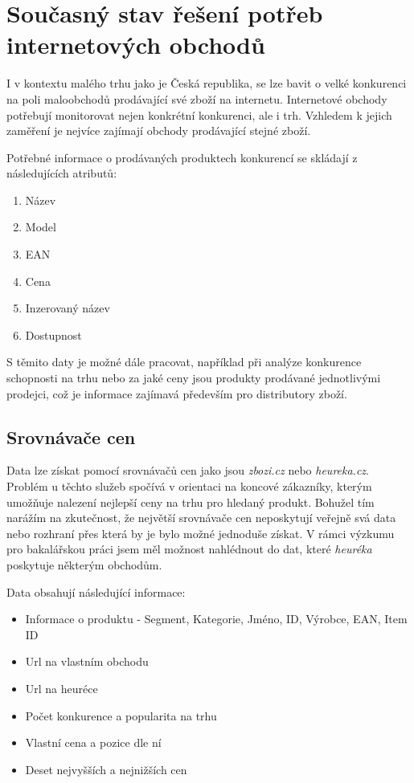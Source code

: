\documentclass[thesis=B,czech]{FITthesis}[2012/06/26]
\begin{document}
\newpage

\section{Současný stav řešení potřeb internetových obchodů}
I v kontextu malého trhu jako je Česká republika, se lze bavit o velké konkurenci na poli 
maloobchodů prodávající své zboží na internetu.
Internetové obchody potřebují monitorovat nejen konkrétní konkurenci, ale i trh. Vzhledem k jejich zaměření je nejvíce zajímají 
obchody prodávající stejné zboží. 
\par
Potřebné informace o prodávaných produktech konkurencí se skládají z následujících atributů:

\begin{enumerate}
\item Název
\item Model
\item EAN
\item Cena
\item Inzerovaný název
\item Dostupnost
\end{enumerate}

S těmito daty je možné dále pracovat, například při analýze konkurence schopnosti na trhu nebo za jaké ceny jsou produkty prodávané
jednotlivými prodejci, což je informace zajímavá především pro distributory zboží. \cite{hunka}

\subsection{Srovnávače cen}

Data lze získat pomocí srovnávačů cen jako jsou \textit{zbozi.cz}\cite{heureka} 
nebo \textit{heureka.cz}\cite{zbozi}. Problém u těchto služeb spočívá v orientaci na koncové zákazníky, kterým umožňuje
nalezení nejlepší ceny na trhu pro hledaný produkt. Bohužel tím narážím na zkutečnost, že největší srovnávače cen neposkytují veřejně 
svá data nebo rozhraní přes která by je bylo možné jednoduše získat. V rámci výzkumu pro bakalářskou práci jsem měl možnost nahlédnout do dat, které \textit{heuréka} poskytuje některým obchodům. \cite{hunka}

Data obsahují následující informace:
\begin{itemize}
\item Informace o produktu - Segment, Kategorie, Jméno, ID, Výrobce, EAN, Item ID
\item Url na vlastním obchodu
\item Url na heuréce
\item Počet konkurence a popularita na trhu
\item Vlastní cena a pozice dle ní
\item Deset nejvyšších a nejnižších cen
\end{itemize}
\end{document}
